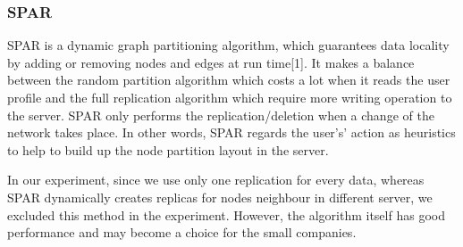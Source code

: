 \subsubsection{SPAR}

SPAR is a dynamic graph partitioning algorithm, which guarantees data locality by adding or removing nodes and edges at run time[1]. It makes a balance between the random partition algorithm which costs a lot when it reads the user profile and the full replication algorithm which require more writing operation to the server. SPAR only performs the replication/deletion when a change of the network takes place. In other words, SPAR regards the user's’ action as heuristics to help to build up the node partition layout in the server.

In our experiment, since we use only one replication for every data, whereas SPAR dynamically creates replicas for nodes neighbour in different server, we excluded this method in the experiment. However, the algorithm itself has good performance and may become a choice for the small companies.